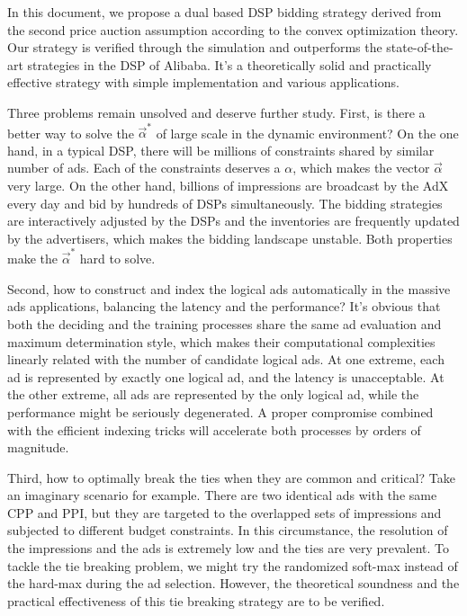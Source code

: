 \documentclass{article}
\newcommand{\valpha}{\vec{\alpha}}
\begin{document}
In this document, we propose a dual based DSP bidding strategy
    derived from the second price auction assumption according to the convex optimization theory.
Our strategy is verified through the simulation and outperforms the state-of-the-art strategies in the DSP of Alibaba.
It's a theoretically solid and practically effective strategy with simple implementation and various applications.

Three problems remain unsolved and deserve further study.
First, is there a better way to solve the $\valpha^*$ of large scale in the dynamic environment?
On the one hand, in a typical DSP, there will be millions of constraints shared by similar number of ads.
Each of the constraints deserves a $\alpha$, which makes the vector $\valpha$ very large.
On the other hand, billions of impressions are broadcast by the AdX every day and bid by hundreds of DSPs simultaneously.
The bidding strategies are interactively adjusted by the DSPs and the inventories are frequently updated by the advertisers,
    which makes the bidding landscape unstable.
Both properties make the $\valpha^*$ hard to solve.

Second, how to construct and index the logical ads automatically in the massive ads applications, balancing the latency and the performance?
It's obvious that both the deciding and the training processes share the same ad evaluation and maximum determination style,
    which makes their computational complexities linearly related with the number of candidate logical ads.
At one extreme, each ad is represented by exactly one logical ad, and the latency is unacceptable.
At the other extreme, all ads are represented by the only logical ad, while the performance might be seriously degenerated.
A proper compromise combined with the efficient indexing tricks will accelerate both processes by orders of magnitude.

Third, how to optimally break the ties when they are common and critical?
Take an imaginary scenario for example.
There are two identical ads with the same CPP and PPI,
    but they are targeted to the overlapped sets of impressions and subjected to different budget constraints.
In this circumstance, the resolution of the impressions and the ads is extremely low and the ties are very prevalent.
To tackle the tie breaking problem, we might try the randomized soft-max instead of the hard-max during the ad selection.
However, the theoretical soundness and the practical effectiveness of this tie breaking strategy are to be verified.
\end{document}
